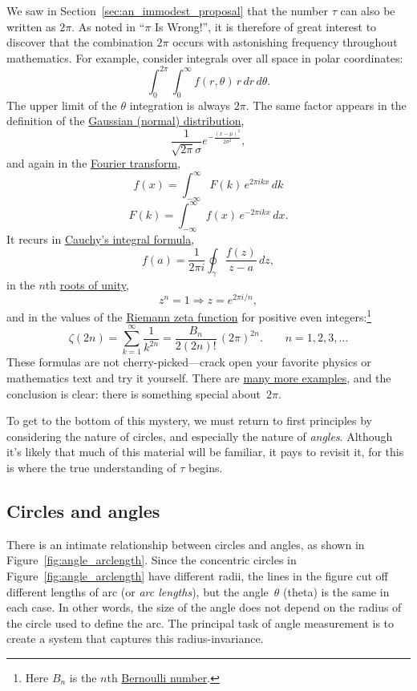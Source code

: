 We saw in Section~\ref{sec:an_immodest_proposal} that the number $\tau$ can also be written as $2\pi$. As noted in ``$\pi$ Is Wrong!'', it is therefore of great interest to discover that the combination $2\pi$ occurs with astonishing frequency throughout mathematics. For example, consider integrals over all space in polar coordinates:
\[
  \int_0^{2\pi}\int_0^\infty f(r, \theta)\, r\, dr\, d\theta.
\]
The upper limit of the $\theta$ integration is always $2\pi$. The same factor appears in the definition of the \href{http://en.wikipedia.org/wiki/Normal_distribution}{Gaussian (normal) distribution},
\[
  \frac{1}{\sqrt{2\pi}\sigma}e^{-\frac{(x-\mu)^2}{2\sigma^2}},
\]
and again in the \href{http://mathworld.wolfram.com/FourierTransform.html}{Fourier transform},
\[
  f(x) = \int_{-\infty}^\infty F(k)\, e^{2\pi ikx}\,dk
\]
\[
    F(k) = \int_{-\infty}^\infty f(x)\, e^{-2\pi ikx}\,dx.
\]
It recurs in \href{http://en.wikipedia.org/wiki/Cauchy's_integral_formula}{Cauchy's integral formula},
\[
  f(a) = \frac{1}{2\pi i}\oint_\gamma\frac{f(z)}{z-a}\,dz,
\]
in the $n$th \href{http://en.wikipedia.org/wiki/Root_of_unity}{roots of unity},
\[
  z^n = 1 \Rightarrow z = e^{2\pi i/n},
\]
and in the values of the \href{http://en.wikipedia.org/wiki/Riemann_zeta_function}{Riemann zeta function} for positive even integers:\footnote{Here $B_n$ is the $n$th \href{http://en.wikipedia.org/wiki/Bernoulli_number}{Bernoulli number}.}
\[
  \zeta(2n) = \sum_{k=1}^\infty \frac{1}{k^{2n}} = \frac{B_n}{2(2n)!}\,(2\pi)^{2n}.\qquad n = 1, 2, 3, \ldots
\]
These formulas are not cherry-picked---crack open your favorite physics or mathematics text and try it yourself. There are \href{http://www.harremoes.dk/Peter/Undervis/Turnpage/Turnpage1.html}{many more examples}, and the conclusion is clear: there is something special about~$2\pi$.

To get to the bottom of this mystery, we must return to first principles by considering the nature of circles, and especially the nature of \emph{angles}. Although it's likely that much of this material will be familiar, it pays to revisit it, for this is where the true understanding of $\tau$ begins.

  \subsection{Circles and angles} %
  \label{sec:circles_and_angles}

There is an intimate relationship between circles and angles, as shown in Figure~\ref{fig:angle_arclength}. Since the concentric circles in Figure~\ref{fig:angle_arclength} have different radii, the lines in the figure cut off different lengths of arc (or \emph{arc lengths}), but the angle~$\theta$ (theta) is the same in each case. In other words, the size of the angle does not depend on the radius of the circle used to define the arc. The principal task of angle measurement is to create a system that captures this radius-invariance.

